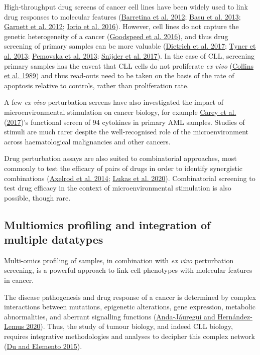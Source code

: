 \documentclass[11pt, a4paper, twosided]{book}
\begin{document}
High-throughput drug screens of cancer cell lines have been widely used to link drug responses to molecular features (\protect\hyperlink{ref-Barretina2012}{Barretina et al. 2012}; \protect\hyperlink{ref-Basu2013}{Basu et al. 2013}; \protect\hyperlink{ref-Garnett2012}{Garnett et al. 2012}; \protect\hyperlink{ref-Iorio2016}{Iorio et al. 2016}). However, cell lines do not capture the genetic heterogeneity of a cancer (\protect\hyperlink{ref-Goodspeed2016}{Goodspeed et al. 2016}), and thus drug screening of primary samples can be more valuable (\protect\hyperlink{ref-JCIpaper}{Dietrich et al. 2017}; \protect\hyperlink{ref-Tyner2013}{Tyner et al. 2013}; \protect\hyperlink{ref-Pemovska2013}{Pemovska et al. 2013}; \protect\hyperlink{ref-Snijder2017}{Snijder et al. 2017}). In the case of CLL, screening primary samples has the caveat that CLL cells do not proliferate \emph{ex vivo} (\protect\hyperlink{ref-Collins1989}{Collins et al. 1989}) and thus read-outs need to be taken on the basis of the rate of apoptosis relative to controls, rather than proliferation rate.

A few \emph{ex vivo} perturbation screens have also investigated the impact of microenvironmental stimulation on cancer biology, for example \protect\hyperlink{ref-Carey2017}{Carey et al.} (\protect\hyperlink{ref-Carey2017}{2017})'s functional screen of 94 cytokines in primary AML samples. Studies of stimuli are much rarer despite the well-recognised role of the microenvironment across haematological malignancies and other cancers.

Drug perturbation assays are also suited to combinatorial approaches, most commonly to test the efficacy of pairs of drugs in order to identify synergistic combinations (\protect\hyperlink{ref-Axelrod2014}{Axelrod et al. 2014}; \protect\hyperlink{ref-Lukas2020}{Lukas et al. 2020}). Combinatorial screening to test drug efficacy in the context of microenvironmental stimulation is also possible, though rare.

\hypertarget{multi-omics-cll-intro}{%
\subsection{Multiomics profiling and integration of multiple datatypes}\label{multi-omics-cll-intro}}

Multi-omics profiling of samples, in combination with \emph{ex vivo} perturbation screening, is a powerful approach to link cell phenotypes with molecular features in cancer.

The disease pathogenesis and drug response of a cancer is determined by complex interactions between mutations, epigenetic alterations, gene expression, metabolic abnormalities, and aberrant signalling functions (\protect\hyperlink{ref-Anda2020}{Anda-Jáuregui and Hernández-Lemus 2020}). Thus, the study of tumour biology, and indeed CLL biology, requires integrative methodologies and analyses to decipher this complex network (\protect\hyperlink{ref-Du2015}{Du and Elemento 2015}).
\end{document}
